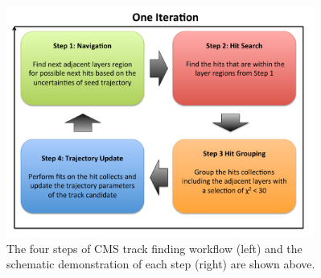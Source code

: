 \begin{figure}[hbtp]
\begin{center}
\includegraphics[width=0.900\textwidth]{Figures/Chapter4/TrackFDWF.pdf}
\caption{The four steps of CMS track finding workflow (left) and the schematic demonstration of each step (right) are shown above.}
\label{CMSTrackFDWF}
\end{center}
\end{figure} 


